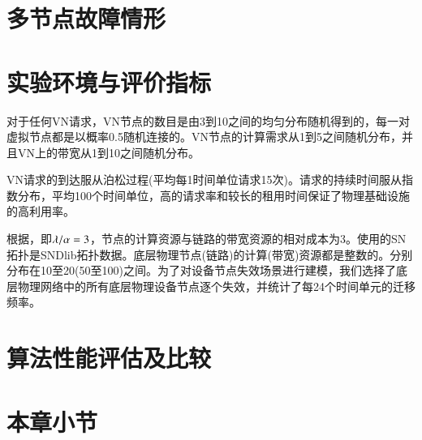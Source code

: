 \section{多节点故障情形}
\section{实验环境与评价指标}
对于任何VN请求，VN节点的数目是由3到10之间的均匀分布随机得到的，每一对虚拟节点都是以概率0.5随机连接的。VN节点的计算需求从1到5之间随机分布，并且VN上的带宽从1到10之间随机分布。

VN请求的到达服从泊松过程(平均每1时间单位请求15次)。请求的持续时间服从指数分布，平均100个时间单位，高的请求率和较长的租用时间保证了物理基础设施的高利用率。

根据\cite{yu2010survivable}，即$\lambda/\alpha=3$，节点的计算资源与链路的带宽资源的相对成本为3。使用的SN 拓扑是SNDlib拓扑数据\cite{orlowski2010sndlib}。底层物理节点(链路)的计算(带宽)资源都是整数的。分别分布在10至20(50至100)之间。为了对设备节点失效场景进行建模，我们选择了底层物理网络中的所有底层物理设备节点逐个失效，并统计了每24个时间单元的迁移频率。


\section{算法性能评估及比较}
\section{本章小节}
